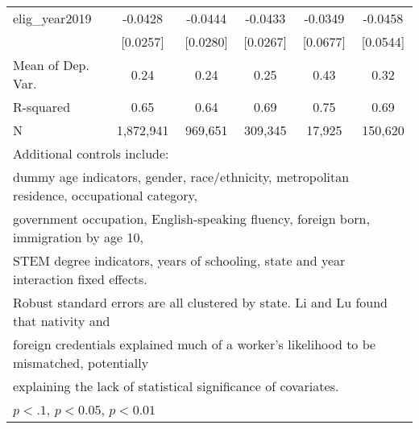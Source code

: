 \begin{table}[htbp]
\begin{tabular}{l*{5}{c}}
\addlinespace
elig\_year2019       &     -0.0428         &     -0.0444         &     -0.0433         &     -0.0349         &     -0.0458         \\
                    &    [0.0257]         &    [0.0280]         &    [0.0267]         &    [0.0677]         &    [0.0544]         \\
\midrule
Mean of Dep. Var.   &        0.24         &        0.24         &        0.25         &        0.43         &        0.32         \\
R-squared           &        0.65         &        0.64         &        0.69         &        0.75         &        0.69         \\
N                   &   1,872,941         &     969,651         &     309,345         &      17,925         &     150,620         \\
\bottomrule
\multicolumn{6}{l}{\footnotesize Additional controls include:}\\
\multicolumn{6}{l}{\footnotesize dummy age indicators, gender, race/ethnicity, metropolitan residence, occupational category,}\\
\multicolumn{6}{l}{\footnotesize government occupation, English-speaking fluency, foreign born, immigration by age 10,}\\
\multicolumn{6}{l}{\footnotesize STEM degree indicators, years of schooling, state and year interaction fixed effects.}\\
\multicolumn{6}{l}{\footnotesize Robust standard errors are all clustered by state. Li and Lu found that nativity and}\\
\multicolumn{6}{l}{\footnotesize foreign credentials explained much of a worker's likelihood to be mismatched, potentially}\\
\multicolumn{6}{l}{\footnotesize explaining the lack of statistical significance of covariates.}\\
\multicolumn{6}{l}{\footnotesize \sym{*} \(p<.1\), \sym{**} \(p<0.05\), \sym{***} \(p<0.01\)}\\
\end{tabular}
\end{table}

